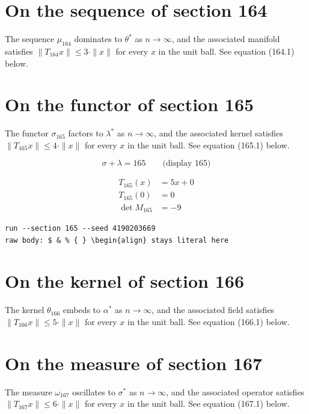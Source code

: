 \documentclass{article}
\begin{document}
\section{On the sequence of section 164}
The sequence $\mu_{164}$ dominates to $\theta^{*}$ as $n \to \infty$,
and the associated manifold satisfies $\|T_{164} x\| \leq 3 \cdot \|x\|$
for every $x$ in the unit ball. See equation (164.1) below.

\section{On the functor of section 165}
The functor $\sigma_{165}$ factors to $\lambda^{*}$ as $n \to \infty$,
and the associated kernel satisfies $\|T_{165} x\| \leq 4 \cdot \|x\|$
for every $x$ in the unit ball. See equation (165.1) below.

$$
\sigma + \lambda = 165 \qquad \text{(display 165)}
$$

\begin{align}
T_{165}(x) &= 5 x + 0 \\
T_{165}(0) &= 0 \\
\det M_{165} &= -9
\end{align}

\begin{verbatim}
run --section 165 --seed 4190203669
raw body: $ & % { } \begin{align} stays literal here
\end{verbatim}

\section{On the kernel of section 166}
The kernel $\theta_{166}$ embeds to $\alpha^{*}$ as $n \to \infty$,
and the associated field satisfies $\|T_{166} x\| \leq 5 \cdot \|x\|$
for every $x$ in the unit ball. See equation (166.1) below.

\section{On the measure of section 167}
The measure $\omega_{167}$ oscillates to $\sigma^{*}$ as $n \to \infty$,
and the associated operator satisfies $\|T_{167} x\| \leq 6 \cdot \|x\|$
for every $x$ in the unit ball. See equation (167.1) below.
\end{document}
